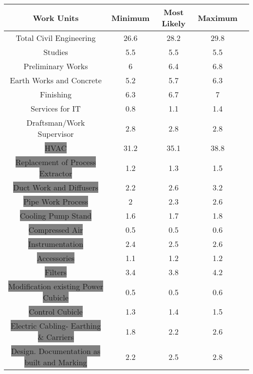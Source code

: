 \begin{table}[ht]
	
\begin{center}
	\begin{tabular}{ |c|c|c|c|c|} 
		\hline
		\hline
		
		Work Units 													& Minimum & Most  Likely&Maximum\\
		\hline
		\colorbox{Melon}{Total Civil Engineering}	&26.6 &28.2&29.8\\ 
		\hline
		\colorbox{Melon}{Studies}							&5.5&5.5&5.5\\ 
		\hline
		\colorbox{Melon}{Preliminary Works}			&6&6.4&6.8\\ 
		\hline
		\colorbox{Melon}{Earth Works and Concrete}	&5.2 &5.7&6.3\\
		\hline
		\colorbox{Melon}{Finishing}							&6.3&6.7&7\\ 
		\hline
		\colorbox{Melon}{Services for IT}				&0.8&1.1&1.4\\
		\hline
		\colorbox{Melon}{Draftsman/Work Supervisor}		&2.8&2.8&2.8\\
		\hline
		\colorbox{Gray}{HVAC}								&31.2 &35.1& 38.8\\
		\hline
		\colorbox{Gray}{Replacement of Process Extractor}	&1.2& 1.3&1.5\\
		\hline
		\colorbox{Gray}{Duct Work and Diffusers}		&2.2&2.6&3.2\\
		\hline
		\colorbox{Gray}{Pipe Work Process}		&2& 2.3&2.6\\
		\hline
		\colorbox{Gray}{Cooling Pump Stand}	&1.6&1.7&1.8\\
		\hline
		\colorbox{Gray}{Compressed Air}			&0.5&0.5&0.6\\
		\hline
		\colorbox{Gray}{Instrumentation}		&2.4&2.5&2.6\\
		\hline
		\colorbox{Gray}{Accessories}			&1.1&1.2&1.2\\
		\hline
		\colorbox{Gray}{Filters}					&3.4&3.8&4.2\\
		\hline
		\colorbox{Gray}{Modification existing Power Cubicle}	&0.5  & 		0.5			&0.6\\
		\hline
		\colorbox{Gray}{Control Cubicle}		&1.3   							& 		1.4			&1.5\\
		\hline
		\colorbox{Gray}{Electric Cabling- Earthing \& Carriers}	&1.8 			& 	2.2				&2.6\\
		\hline
		\colorbox{Gray}{Design. Documentation as built and Marking}	&2.2  			& 		2.5			&2.8\\

\end{tabular}
\end{center}
\end{table}
